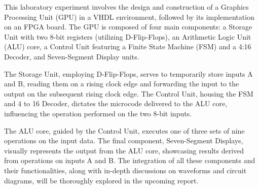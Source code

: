 {This laboratory experiment involves the design and construction of a Graphics Processing Unit (GPU) in a VHDL environment, followed by its implementation on an FPGA board. The GPU is composed of four main components: a Storage Unit with two 8-bit registers (utilizing D-Flip-Flops), an Arithmetic Logic Unit (ALU) core, a Control Unit featuring a Finite State Machine (FSM) and a 4:16 Decoder, and Seven-Segment Display units.}

{The Storage Unit, employing D-Flip-Flops, serves to temporarily store inputs A and B, reading them on a rising clock edge and forwarding the input to the output on the subsequent rising clock edge. The Control Unit, housing the FSM and 4 to 16 Decoder, dictates the microcode delivered to the ALU core, influencing the operation performed on the two 8-bit inputs.}

{The ALU core, guided by the Control Unit, executes one of three sets of nine operations on the input data. The final component, Seven-Segment Displays, visually represents the output from the ALU core, showcasing results derived from operations on inputs A and B. The integration of all these components and their functionalities, along with in-depth discussions on waveforms and circuit diagrams, will be thoroughly explored in the upcoming report.}

{}

{}

